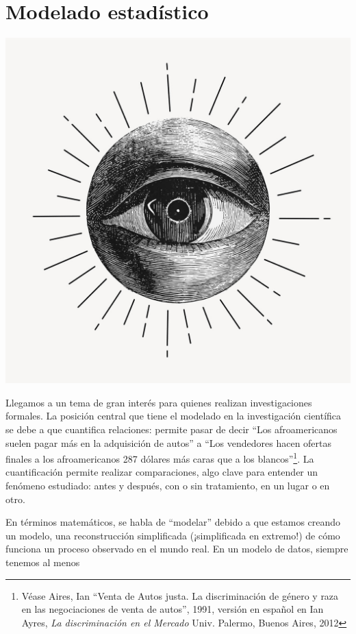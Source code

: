 \documentclass[
]{book}
\begin{document}
\hypertarget{modelado-estaduxedstico}{%
\chapter{Modelado estadístico}\label{modelado-estaduxedstico}}

\includegraphics[width=1\linewidth]{imagenes/modelado}

Llegamos a un tema de gran interés para quienes realizan investigaciones formales. La posición central que tiene el modelado en la investigación científica se debe a que cuantifica relaciones: permite pasar de decir ``Los afroamericanos suelen pagar más en la adquisición de autos'' a ``Los vendedores hacen ofertas finales a los afroamericanos 287 dólares más caras que a los blancos''\footnote{Véase Aires, Ian ``Venta de Autos justa. La discriminación de género y raza en las negociaciones de venta de autos'', 1991, versión en español en Ian Ayres, \emph{La discriminación en el Mercado} Univ. Palermo, Buenos Aires, 2012}. La cuantificación permite realizar comparaciones, algo clave para entender un fenómeno estudiado: antes y después, con o sin tratamiento, en un lugar o en otro.

En términos matemáticos, se habla de ``modelar'' debido a que estamos creando un modelo, una reconstrucción simplificada (¡simplificada en extremo!) de cómo funciona un proceso observado en el mundo real. En un modelo de datos, siempre tenemos al menos
\end{document}

